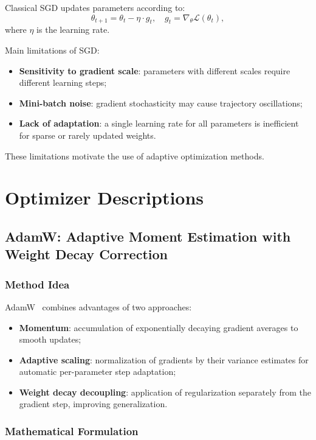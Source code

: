 \documentclass[a4paper,12pt]{article}
\begin{document}
Classical SGD updates parameters according to:
\begin{equation}
    \theta_{t+1} = \theta_t - \eta \cdot g_t, \quad g_t = \nabla_\theta \mathcal{L}(\theta_t),
\end{equation}
where $\eta$ is the learning rate.

Main limitations of SGD:
\begin{itemize}
    \item \textbf{Sensitivity to gradient scale}: parameters with different scales require different learning steps;
    \item \textbf{Mini-batch noise}: gradient stochasticity may cause trajectory oscillations;
    \item \textbf{Lack of adaptation}: a single learning rate for all parameters is inefficient for sparse or rarely updated weights.
\end{itemize}

These limitations motivate the use of adaptive optimization methods.
\newpage

\section{Optimizer Descriptions}
\label{sec:optimizers}

\subsection{AdamW: Adaptive Moment Estimation with Weight Decay Correction}

\subsubsection{Method Idea}

AdamW~\cite{loshchilov2019adamw} combines advantages of two approaches:
\begin{itemize}
    \item \textbf{Momentum}: accumulation of exponentially decaying gradient averages to smooth updates;
    \item \textbf{Adaptive scaling}: normalization of gradients by their variance estimates for automatic per-parameter step adaptation;
    \item \textbf{Weight decay decoupling}: application of regularization separately from the gradient step, improving generalization.
\end{itemize}

\subsubsection{Mathematical Formulation}
\end{document}

